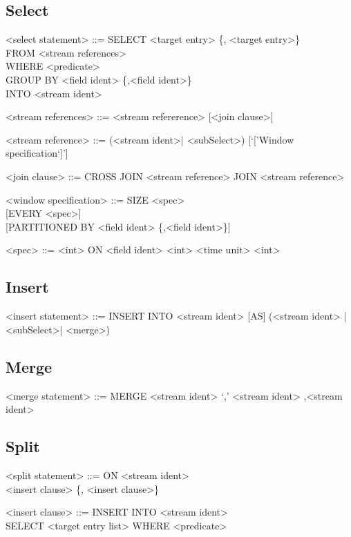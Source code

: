 \subsection{Select}
\begin{grammar}
<select statement> ::= SELECT <target entry> \{, <target entry>\}\\
	FROM <stream references> \\
	WHERE <predicate> \\
	GROUP BY <field ident> \{,<field ident>\} \\
	INTO <stream ident>
	
<stream references> ::= <stream refererence> [<join clause>]

<stream reference> ::= (<stream ident>| <subSelect>) [`['Window specification`]']

<join clause> ::= CROSS JOIN <stream reference>
				\alt [INNER] JOIN <stream reference>

<window specification> ::= 
								SIZE <spec> \\
								{ }[EVERY <spec>]\\
								{ }[PARTITIONED BY <field ident> \{,<field ident>\}]

<spec> ::= <int> ON <field ident>
			\alt <int> <time unit>
			\alt <int>
\end{grammar}


\subsection{Insert}

\begin{grammar}
<insert statement> ::= INSERT INTO <stream ident> [AS] 
							(<stream ident> | <subSelect>| <merge>)
\end{grammar}


\subsection{Merge}
\begin{grammar}
<merge statement> ::= MERGE <stream ident> `,' <stream ident> {,<stream ident>}
\end{grammar}

\subsection{Split}
\begin{grammar}
<split statement> ::= ON <stream ident> \\
						<insert clause> \{, <insert clause>\}
						
<insert clause> ::= INSERT INTO <stream ident> \\SELECT <target entry list> WHERE <predicate>
\end{grammar}

